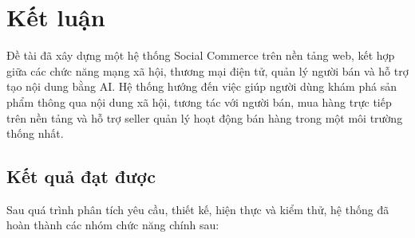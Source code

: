 \chapter{Kết luận}

Đề tài đã xây dựng một hệ thống Social Commerce trên nền tảng web, kết hợp giữa các chức năng mạng xã hội, thương mại điện tử, quản lý người bán và hỗ trợ tạo nội dung bằng AI. Hệ thống hướng đến việc giúp người dùng khám phá sản phẩm thông qua nội dung xã hội, tương tác với người bán, mua hàng trực tiếp trên nền tảng và hỗ trợ seller quản lý hoạt động bán hàng trong một môi trường thống nhất.

\section{Kết quả đạt được}

Sau quá trình phân tích yêu cầu, thiết kế, hiện thực và kiểm thử, hệ thống đã hoàn thành các nhóm chức năng chính sau:

